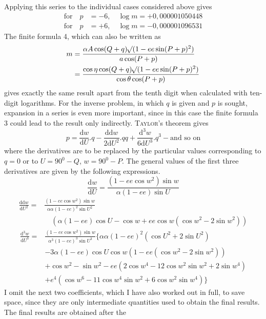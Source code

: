 %
\noindent Applying this series to the individual cases considered above gives
\[
\begin{aligned}
\text{for}\quad p&=-6,\quad\log m=+0{,}000001050448\\
\text{for}\quad p&=+6,\quad\log m=-0{,}000001096531
\end{aligned}
\]
The finite formula 4, which can also be written as
\[
\begin{aligned}
m&=\frac{\alpha A\cos(Q+q)\mathord{{}^{}\!\surd}(1-ee\sin(P+p)^2)}{a\cos(P+p)}\\
&=\frac{\cos\eta\cos(Q+q)\mathord{{}^{}\!\surd}(1-ee\sin(P+p)^2)}{\cos\theta\cos(P+p)}
\end{aligned}
\]
gives exactly the same result apart from the tenth digit when calculated with ten-digit logarithms.
\indent For the inverse problem, in which \(q\) is given and \(p\) is sought, expansion in a series is even more important, since in this case the finite formula 3 could lead to the result only indirectly. \textsc{Taylor}'s theorem gives
\[
p=\frac{\mathrm{d}w}{\mathrm{d}U}\mathord{.}q-\frac{\mathrm{dd}w}{2\mathrm{d}U^2}\mathord{.}qq+\frac{\mathrm{d}^3w}{6\mathrm{d}U^3}\mathord{.}q^3-\text{and so on}
\]
where the derivatives are to be replaced by the particular values corresponding to \(q=0\) or to \(U=90^0-Q\), \(w=90^0-P\). The general values of the first three derivatives are given by the following expressions.
\[
\frac{\mathrm{d}w}{\mathrm{d}U}=\frac{(1-ee\cos w^2)\sin w}{\alpha(1-ee)\sin U}
\]
\[
\begin{aligned}
\frac{\mathrm{dd}w}{\mathrm{d}U^2}={}&\frac{(1-ee\cos w^2)\sin w}{\alpha\alpha(1-ee)^2\sin U^2}\\
&\quad(\alpha(1-ee)\cos U-\cos w+ee\cos w(\cos w^2-2\sin w^2))
\end{aligned}
\]
\[
\begin{aligned}
\frac{\mathrm{d}^3w}{\mathrm{d}U^3}={}&\frac{(1-ee\cos w^2)\sin w}{\alpha^3(1-ee)^3\sin U^3}\{\alpha\alpha(1-ee)^2(\cos U^2+2\sin U^2)\\
&-3\alpha(1-ee)\cos U\cos w(1-ee(\cos w^2-2\sin w^2))\\
&+\cos w^2-\sin w^2-ee(2\cos w^4-12\cos w^2\sin w^2+2\sin w^4)\\
&+e^4(\cos w^6-11\cos w^4\sin w^2+6\cos w^2\sin w^4)\}
\end{aligned}
\]
\indent I omit the next two coefficients, which I have also worked out in full, to save space, since they are only intermediate quantities used to obtain the final results. The final results are obtained after the %
